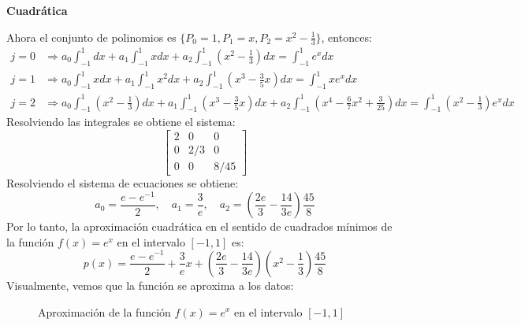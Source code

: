 \documentclass{article}
\begin{document}
\begin{center}
    \textbf{Cuadrática}
\end{center}
Ahora el conjunto de polinomios es $\{ P_0 = 1, P_1 = x, P_2 = x^2 - \frac{1}{3} \}$, entonces:
\begin{align}
    j = 0 &\Rightarrow a_0 \int_{-1}^{1} dx + a_1 \int_{-1}^{1} x dx + a_2 \int_{-1}^{1} (x^2 - \frac{1}{3}) dx = \int_{-1}^{1} e^x dx \\
    j = 1 &\Rightarrow a_0 \int_{-1}^{1} x dx + a_1 \int_{-1}^{1} x^2 dx + a_2 \int_{-1}^{1} (x^3 - \frac{3}{5}x) dx = \int_{-1}^{1} xe^x dx \\
    j = 2 &\Rightarrow a_0 \int_{-1}^{1} (x^2 - \frac{1}{3}) dx + a_1 \int_{-1}^{1} (x^3 - \frac{3}{5}x) dx + a_2 \int_{-1}^{1} (x^4 - \frac{6}{7}x^2 + \frac{3}{25}) dx = \int_{-1}^{1} (x^2 - \frac{1}{3})e^x dx
\end{align}
Resolviendo las integrales se obtiene el sistema:
\begin{equation}
    \begin{bmatrix}
        2 & 0 & 0 \\
        0 & 2/3 & 0 \\
        0 & 0 & 8/45
    \end{bmatrix}
\end{equation}
Resolviendo el sistema de ecuaciones se obtiene:
\begin{equation}
    a_0 = \frac{e - e^{-1}}{2}, \quad a_1 = \frac{3}{e}, \quad a_2 = (\frac{2e}{3} - \frac{14}{3e}) \frac{45}{8}
\end{equation}
Por lo tanto, la aproximación cuadrática en el sentido de cuadrados mínimos de la función \( f(x) = e^x \) en el intervalo \([-1,1]\) es:
\begin{equation}
    p(x) = \frac{e - e^{-1}}{2} + \frac{3}{e}x + \left( \frac{2e}{3} - \frac{14}{3e} \right) \left( x^2 - \frac{1}{3} \right) \frac{45}{8}
\end{equation}
\newpage
Visualmente, vemos que la función se aproxima a los datos:
\begin{figure}[h]
    \centering
    \caption{Aproximación de la función \( f(x) = e^x \) en el intervalo \([-1,1]\)}
    \label{fig:myplot14}
\end{figure}
\end{document}
